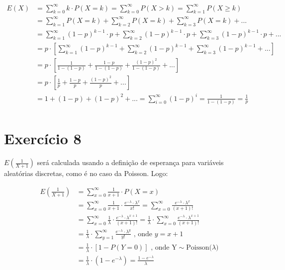 \documentclass[12pt,letterpaper]{article}
\begin{document}
	\begin{equation*}
		\begin{split}
			E(X) & = \sum_{k=0}^{\infty} k \cdot P(X=k) = \sum_{k=0}^{\infty} P(X>k) = \sum_{k=1}^{\infty} P(X \geq k)\\ 
			& = \sum_{k=1}^{\infty} P(X=k) + \sum_{k=2}^{\infty} P(X=k) + \sum_{k=3}^{\infty} P(X=k) +... \\
			& = \sum_{k=1}^{\infty} (1-p)^{k-1} \cdot p + \sum_{k=2}^{\infty} (1-p)^{k-1} \cdot p + \sum_{k=3}^{\infty} (1-p)^{k-1} \cdot p + ... \\
			& = p \cdot [\sum_{k=1}^{\infty} (1-p)^{k-1} + \sum_{k=2}^{\infty} (1-p)^{k-1} + \sum_{k=3}^{\infty} (1-p)^{k-1} + ...]\\
			& = p \cdot [\frac{1}{1-(1-p)} + \frac{1-p}{1-(1-p)} + \frac{(1-p)^2}{1-(1-p)} + ...]\\
			& = p \cdot [\frac{1}{p} + \frac{1-p}{p} + \frac{(1-p)^2}{p} + ...]\\
			& = 1 + (1-p) + (1-p)^2 + ... = \sum_{i = 0}^{\infty} (1-p)^i = \frac{1}{1-(1-p)} = \frac{1}{p}\\
		\end{split}
	\end{equation*}
	
	\section*{Exercício 8}
	
	$E(\frac{1}{X+1})$ será calculada usando a definição de esperança para variáveis aleatórias discretas, como é no caso da Poisson. Logo:
	
	\begin{equation*}
		\begin{split}
			E(\frac{1}{X+1}) & = \sum_{x=0}^{\infty} \frac{1}{x+1} \cdot P(X=x)\\
			& = \sum_{x=0}^{\infty} \frac{1}{x+1} \cdot \frac{e^{-\lambda}\cdot \lambda^x}{x!} = \sum_{x=0}^{\infty} \frac{e^{-\lambda}\cdot \lambda^x}{(x+1)!} \\
			& = \sum_{x=0}^{\infty}\frac{1}{\lambda} \cdot \frac{e^{-\lambda}\cdot \lambda^{x+1}}{(x+1)!} = \frac{1}{\lambda} \cdot \sum_{x=0}^{\infty} \frac{e^{-\lambda}\cdot \lambda^{x+1}}{(x+1)!} \\
			& = \frac{1}{\lambda} \cdot \sum_{y=1}^{\infty} \frac{e^{-\lambda}\cdot \lambda^y}{y!} \text{ , onde $y=x+1$}\\
			& = \frac{1}{\lambda} \cdot [1-P(Y=0)] \text{ , onde Y$\sim$Poisson($\lambda$)} \\ 
			& = \frac{1}{\lambda} \cdot (1 - e^{-\lambda}) = \frac{1 - e^{-\lambda}}{\lambda} 
	\end{split}
	\end{equation*}
	
	
\end{document}

